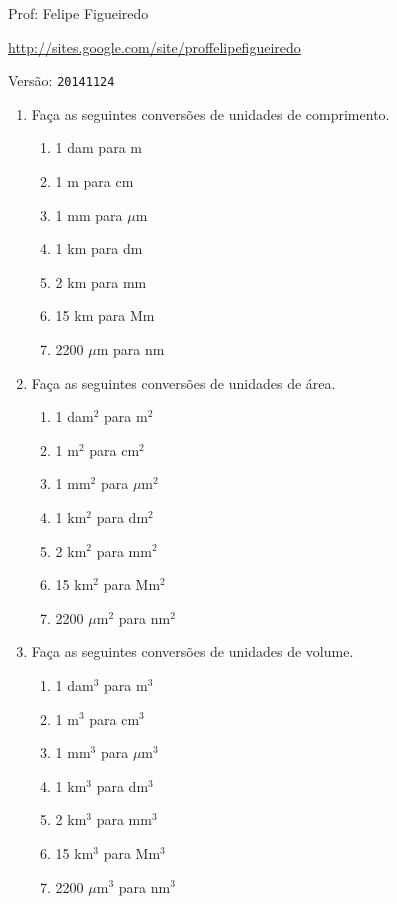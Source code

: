 \documentclass[a4paper]{article}
\begin{document}
\parbox[c]{.825\textwidth}{\raggedright%
{Prof: Felipe Figueiredo\par}
{\url{http://sites.google.com/site/proffelipefigueiredo}}
}

Versão: \verb|20141124|



\begin{enumerate}
\item Faça as seguintes conversões de unidades de comprimento.
  \begin{enumerate}
  \item 1 dam para m
  \item 1 m para cm
  \item 1 mm para $\mu$m
  \item 1 km para dm
  \item 2 km para mm
  \item 15 km para Mm
  \item 2200 $\mu$m para nm
  \end{enumerate}
\item Faça as seguintes conversões de unidades de área.
  \begin{enumerate}
  \item 1 dam$^2$ para m$^2$
  \item 1 m$^2$ para cm$^2$
  \item 1 mm$^2$ para $\mu$m$^2$
  \item 1 km$^2$ para dm$^2$
  \item 2 km$^2$ para mm$^2$
  \item 15 km$^2$ para Mm$^2$
  \item 2200 $\mu$m$^2$ para nm$^2$
  \end{enumerate}

\item Faça as seguintes conversões de unidades de volume.
  \begin{enumerate}
  \item 1 dam$^3$ para m$^3$
  \item 1 m$^3$ para cm$^3$
  \item 1 mm$^3$ para $\mu$m$^3$
  \item 1 km$^3$ para dm$^3$
  \item 2 km$^3$ para mm$^3$
  \item 15 km$^3$ para Mm$^3$
  \item 2200 $\mu$m$^3$ para nm$^3$
  \end{enumerate}


\end{enumerate}
\end{document}
